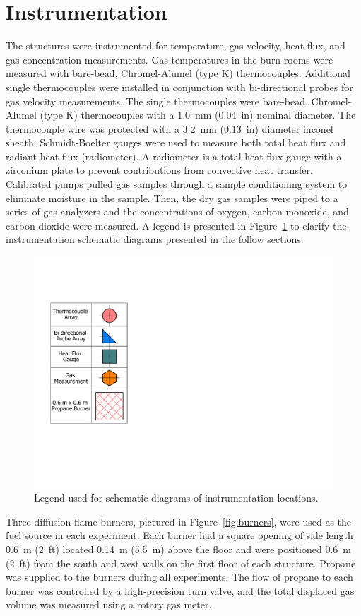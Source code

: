 \clearpage
\section{Instrumentation}
\label{sec:intrumentation}
The structures were instrumented for temperature, gas velocity, heat flux, and gas concentration measurements. Gas temperatures in the burn rooms were measured with bare-bead, Chromel-Alumel (type K) thermocouples. Additional single thermocouples were installed in conjunction with bi-directional probes for gas velocity measurements. The single thermocouples were bare-bead, Chromel-Alumel (type K) thermocouples with a 1.0~mm (0.04~in) nominal diameter. The thermocouple wire was protected with a 3.2~mm (0.13~in) diameter inconel sheath. Schmidt-Boelter gauges were used to measure both total heat flux and radiant heat flux (radiometer). A radiometer is a total heat flux gauge with a zirconium plate to prevent contributions from convective heat transfer. Calibrated pumps pulled gas samples through a sample conditioning system to eliminate moisture in the sample. Then, the dry gas samples were piped to a series of gas analyzers and the concentrations of oxygen, carbon monoxide, and carbon dioxide were measured. A legend is presented in Figure~\ref{fig:Instrumentation_Legend} to clarify the instrumentation schematic diagrams presented in the follow sections.

\begin{figure}[!h]
	\centering
	\includegraphics[width=0.25\columnwidth]{Figures/Floor_Plans/Instrumentation_Legend}
	\caption[Instrumentation legend]{Legend used for schematic diagrams of instrumentation locations.}
	\label{fig:Instrumentation_Legend}
\end{figure}

Three diffusion flame burners, pictured in Figure~\ref{fig:burners}, were used as the fuel source in each experiment. Each burner had a square opening of side length 0.6~m (2~ft) located 0.14~m (5.5~in) above the floor and were positioned 0.6~m (2~ft) from the south and west walls on the first floor of each structure. Propane was supplied to the burners during all experiments. The flow of propane to each burner was controlled by a high-precision turn valve, and the total displaced gas volume was measured using a rotary gas meter.

